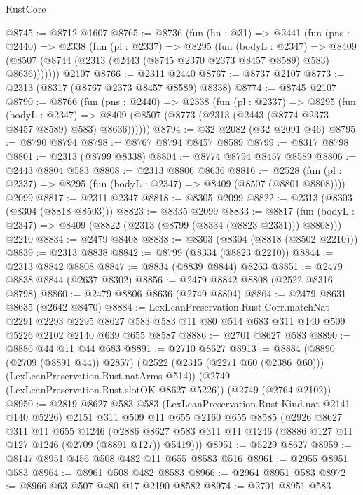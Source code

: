 \begin{lexlean}{RustCore}
\begin{coremodule}
@8745 := @8712 @1607
@8765 := @8736
    (fun (hn : @31) =>
    @2441
      (fun (pns : @2440) =>
      @2338
        (fun (pl : @2337) =>
        @8295
          (fun (bodyL : @2347) =>
          @8409 (@8507 (@8744 (@2313 (@2443 (@8745 @2370 @2373 @8457 @8589) @583) @8636)))))))
    @2107
@8766 := @2311 @2440
@8767 := @8737 @2107
@8773 := @2313 (@8317 (@8767 @2373 @8457 @8589) @8338)
@8774 := @8745 @2107
@8790 := @8766
    (fun (pns : @2440) =>
    @2338
      (fun (pl : @2337) =>
      @8295
        (fun (bodyL : @2347) =>
        @8409 (@8507 (@8773 (@2313 (@2443 (@8774 @2373 @8457 @8589) @583) @8636))))))
@8794 := @32 @2082 (@32 @2091 @46)
@8795 := @8790 @8794
@8798 := @8767 @8794 @8457 @8589
@8799 := @8317 @8798
@8801 := @2313 (@8799 @8338)
@8804 := @8774 @8794 @8457 @8589
@8806 := @2443 @8804 @583
@8808 := @2313 @8806 @8636
@8816 := @2528
    (fun (pl : @2337) => @8295 (fun (bodyL : @2347) => @8409 (@8507 (@8801 @8808))))
    @2099
@8817 := @2311 @2347
@8818 := @8305 @2099
@8822 := @2313 (@8303 (@8304 (@8818 @8503)))
@8823 := @8335 @2099
@8833 := @8817
    (fun (bodyL : @2347) => @8409 (@8822 (@2313 (@8799 (@8334 (@8823 @2331))) @8808)))
    @2210
@8834 := @2479 @8408
@8838 := @8303 (@8304 (@8818 (@8502 @2210)))
@8839 := @2313 @8838
@8842 := @8799 (@8334 (@8823 @2210))
@8844 := @2313 @8842 @8808
@8847 := @8834 (@8839 @8844) @8263
@8851 := @2479 @8838 @8844 (@2637 @8302)
@8856 := @2479 @8842 @8808 (@2522 @8316 @8798)
@8860 := @2479 @8806 @8636 (@2749 @8804)
@8864 := @2479 @8631 @8635 (@2642 @8470)
@8884 := LexLeanPreservation.Rust.Corr.matchNat
    @2291
    @2293
    @2295
    @8627
    @583
    @583
    @11
    @80
    @514
    @683
    @311
    @140
    @509
    @5226
    @2102
    @2140
    @639
    @655
    @8587
@8886 := @2701 @8627 @583
@8890 := @8886 @44 @11 @44 @683
@8891 := @2710 @8627
@8913 := @8884
    (@8890 (@2709 (@8891 @44)) @2857)
    (@2522 (@2315 (@2271 @60 (@2386 @60))) (LexLeanPreservation.Rust.natArms @514))
    (@2749 (LexLeanPreservation.Rust.slotOK @8627 @5226))
    (@2749 (@2764 @2102))
@8950 := @2819
    @8627
    @583
    @583
    (LexLeanPreservation.Rust.Kind.nat @2141 @140 @5226)
    @2151
    @311
    @509
    @11
    @655
    @2160
    @655
    @8585
    (@2926
      @8627
      @311
      @11
      @655
      @1246
      (@2886 @8627 @583 @311 @11 @1246 (@8886 @127 @11 @127 @1246 (@2709 (@8891 @127)) @5419)))
@8951 := @5229 @8627
@8959 := @8147 @8951 @456 @508 @482 @11 @655 @8583 @516
@8961 := @2955 @8951 @583
@8964 := @8961 @508 @482 @8583
@8966 := @2964 @8951 @583
@8972 := @8966 @63 @507 @480 @17 @2190 @8582
@8974 := @2701 @8951 @583

\end{coremodule}
\end{lexlean}
